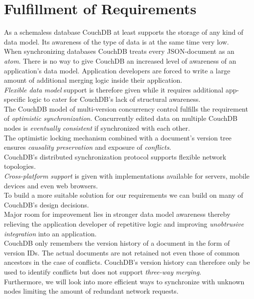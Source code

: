 \section{Fulfillment of Requirements}
As a schemaless database CouchDB at least supports the storage of any kind of data model.
Its awareness of the type of data is at the same time very low.\\
When synchronizing databases CouchDB treats every JSON-document as an \emph{atom}.
There is no way to give CouchDB an increased level of awareness of an application's data model.
Application developers are forced to write a large amount of additional merging logic inside their application.\\
\emph{Flexible data model} support is therefore given while it requires additional app-specific logic to cater for CouchDB's lack of structural awareness.\\
The CouchDB model of multi-version concurrency control fulfills the requirement of \emph{optimistic synchronization}.
Concurrently edited data on multiple CouchDB nodes is \emph{eventually consistent} if synchronized with each other.\\
The optimistic locking mechanism combined with a document's version tree ensures \emph{causality preservation} and exposure of \emph{conflicts}.\\
CouchDB's distributed synchronization protocol supports {flexible network topologies}.\\
\emph{Cross-platform support} is given with implementations available for servers, mobile devices and even web browsers.\\

To build a more suitable solution for our requirements we can build on many of CouchDB's design decisions.\\
Major room for improvement lies in stronger data model awareness thereby relieving the application developer of repetitive logic and improving \emph{unobtrusive integration} into an application.\\
CouchDB only remembers the version history of a document in the form of version IDs.
The actual documents are not retained not even those of common ancestors in the case of conflicts.
CouchDB's version history can therefore only be used to identify conflicts but does not support \emph{three-way merging}.\\
Furthermore, we will look into more efficient ways to synchronize with unknown nodes limiting the amount of redundant network requests.
